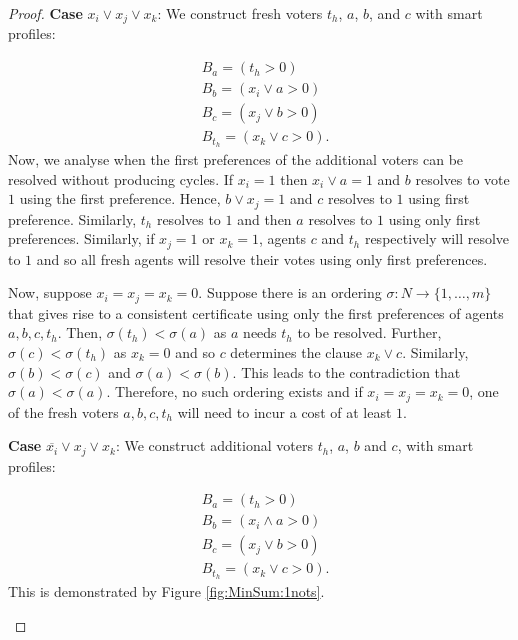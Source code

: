 \documentclass[11pt,a4paper, titlepage]{article}
\theoremstyle{definition}
\begin{document}
\begin{proof}
\textbf{Case} $x_i \lor x_j \lor x_k$: We construct fresh voters $t_h$, $a$, $b$, and $c$ with smart profiles:

\begin{align*}
    &B_a = (t_h > 0) \\
    &B_b = (x_i \lor a > 0) \\
    &B_c = (x_j \lor b > 0) \\
    &B_{t_h} = (x_k \lor c > 0).
\end{align*}
Now, we analyse when the first preferences of the additional voters can be resolved without producing cycles. If $x_i = 1$ then $x_i \lor a = 1$ and $b$ resolves to vote $1$ using the first preference. 
Hence, $b \lor x_j = 1$ and $c$ resolves to $1$ using first preference. 
Similarly, $t_h$ resolves to $1$ and then $a$ resolves to $1$ using only first preferences. 
Similarly, if $x_j = 1$ or $x_k = 1$, agents $c$ and $t_h$ respectively will resolve to $1$ and so all fresh agents will resolve their votes using only first preferences.

Now, suppose $x_i = x_j = x_k = 0$. Suppose there is an ordering $\sigma \colon N \longrightarrow \{1,\ldots, m\}$ that gives rise to a consistent certificate using only the first preferences of agents $a, b, c, t_h$. Then, $\sigma(t_h) < \sigma(a)$ as $a$ needs $t_h$ to be resolved. Further, $\sigma(c) < \sigma(t_h)$ as $x_k = 0$ and so $c$ determines the clause $x_k \lor c$. Similarly, $\sigma(b) < \sigma(c)$ and $\sigma(a) < \sigma(b)$. This leads to the contradiction that $\sigma(a) < \sigma(a)$. Therefore, no such ordering exists and if $x_i = x_j = x_k = 0$, one of the fresh voters $a, b, c, t_h$ will need to incur a cost of at least $1$.

\textbf{Case} $\overline{x_i} \lor x_j \lor x_k$: We construct additional voters $t_h$, $a$, $b$ and $c$, with smart profiles:

\begin{align*}
    &B_a = (t_h > 0) \\
    &B_b = (x_i \land a > 0) \\
    &B_c = (x_j \lor b > 0) \\
    &B_{t_h} = (x_k \lor c > 0).
\end{align*}
This is demonstrated by Figure \ref{fig:MinSum:1nots}.

    \begin{figure}
        \centering
\end{figure}
\end{proof}
\end{document}
